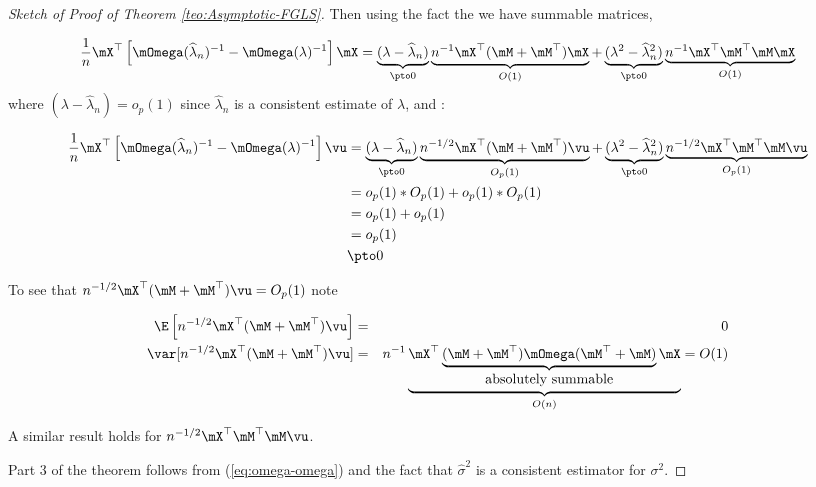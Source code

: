 \documentclass[english,12pt]{book}\usepackage[]{graphicx}\usepackage[]{xcolor}
\begin{document}
\begin{proof}[Sketch of Proof of Theorem \ref{teo:Asymptotic-FGLS}]
Then using the fact the we have summable matrices, 

\begin{equation*}
  \frac{1}{n}\mX^\top\left[\mOmega(\widehat{\lambda}_n)^{-1}- \mOmega(\lambda)^{-1}\right]\mX = \underbrace{(\lambda - \widehat{\lambda}_n)}_{\pto 0}\underbrace{n^{-1}\mX^\top(\mM + \mM^\top)\mX}_{O(1)} + \underbrace{(\lambda^2 - \widehat{\lambda}_n^2)}_{\pto 0}\underbrace{n^{-1}\mX^\top\mM^\top\mM\mX}_{O(1)}
\end{equation*}
%
where $(\lambda - \widehat{\lambda}_n)=o_p(1)$ since $\widehat{\lambda}_n$ is a consistent estimate of $\lambda$,  and :

\begin{equation}
  \begin{aligned}
  \frac{1}{n}\mX^\top\left[\mOmega(\widehat{\lambda}_n)^{-1}- \mOmega(\lambda)^{-1}\right]\vu & = \underbrace{(\lambda - \widehat{\lambda}_n)}_{\pto 0}\underbrace{n^{-1/2}\mX^\top(\mM + \mM^\top)\vu}_{O_p(1)} + \underbrace{(\lambda^2 - \widehat{\lambda}_n^2)}_{\pto 0}\underbrace{n^{-1/2}\mX^\top\mM^\top\mM\vu}_{O_p(1)} \\
  & =  o_p(1)*O_p(1) + o_p(1)*O_p(1) \\
  & = o_p(1) + o_p(1) \\
  & = o_p(1) \\
  & \pto 0
  \end{aligned}
\end{equation}

To see that $n^{-1/2}\mX^\top(\mM + \mM^\top)\vu = O_p(1)$ note


\begin{eqnarray*}
\E\left[n^{-1/2}\mX^\top(\mM + \mM^\top)\vu\right] &=& 0 \\
\var[n^{-1/2}\mX^\top(\mM + \mM^\top)\vu] &=& n^{-1}\underbrace{\mX^\top\underbrace{(\mM + \mM^\top)\mOmega(\mM^\top + \mM)}_{\mbox{absolutely summable}}\mX}_{O(n)} = O(1)
\end{eqnarray*}

A similar result holds for $n^{-1/2}\mX^\top\mM^\top\mM\vu$.


Part 3 of the theorem follows from (\ref{eq:omega-omega}) and the fact that $\widehat{\sigma}^2$ is a consistent estimator for $\sigma^2$.
\end{proof}


\end{document}
